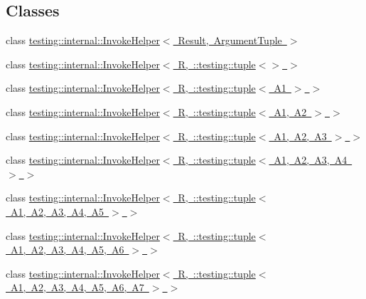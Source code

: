 \subsection*{Classes}
\begin{DoxyCompactItemize}
\item 
class \mbox{\hyperlink{classtesting_1_1internal_1_1_invoke_helper}{testing\+::internal\+::\+Invoke\+Helper$<$ Result, Argument\+Tuple $>$}}
\item 
class \mbox{\hyperlink{classtesting_1_1internal_1_1_invoke_helper_3_01_r_00_01_1_1testing_1_1tuple_3_4_01_4}{testing\+::internal\+::\+Invoke\+Helper$<$ R, \+::testing\+::tuple$<$$>$ $>$}}
\item 
class \mbox{\hyperlink{classtesting_1_1internal_1_1_invoke_helper_3_01_r_00_01_1_1testing_1_1tuple_3_01_a1_01_4_01_4}{testing\+::internal\+::\+Invoke\+Helper$<$ R, \+::testing\+::tuple$<$ A1 $>$ $>$}}
\item 
class \mbox{\hyperlink{classtesting_1_1internal_1_1_invoke_helper_3_01_r_00_01_1_1testing_1_1tuple_3_01_a1_00_01_a2_01_4_01_4}{testing\+::internal\+::\+Invoke\+Helper$<$ R, \+::testing\+::tuple$<$ A1, A2 $>$ $>$}}
\item 
class \mbox{\hyperlink{classtesting_1_1internal_1_1_invoke_helper_3_01_r_00_01_1_1testing_1_1tuple_3_01_a1_00_01_a2_00_01_a3_01_4_01_4}{testing\+::internal\+::\+Invoke\+Helper$<$ R, \+::testing\+::tuple$<$ A1, A2, A3 $>$ $>$}}
\item 
class \mbox{\hyperlink{classtesting_1_1internal_1_1_invoke_helper_3_01_r_00_01_1_1testing_1_1tuple_3_01_a1_00_01_a2_00_01_a3_00_01_a4_01_4_01_4}{testing\+::internal\+::\+Invoke\+Helper$<$ R, \+::testing\+::tuple$<$ A1, A2, A3, A4 $>$ $>$}}
\item 
class \mbox{\hyperlink{classtesting_1_1internal_1_1_invoke_helper_3_01_r_00_01_1_1testing_1_1tuple_3_01_a1_00_01_a2_00_5dd6c0827e45a39a81d93a14211e2a19}{testing\+::internal\+::\+Invoke\+Helper$<$ R, \+::testing\+::tuple$<$ A1, A2, A3, A4, A5 $>$ $>$}}
\item 
class \mbox{\hyperlink{classtesting_1_1internal_1_1_invoke_helper_3_01_r_00_01_1_1testing_1_1tuple_3_01_a1_00_01_a2_00_5653fefa261cff106ebaaf9c78f6ee42}{testing\+::internal\+::\+Invoke\+Helper$<$ R, \+::testing\+::tuple$<$ A1, A2, A3, A4, A5, A6 $>$ $>$}}
\item 
class \mbox{\hyperlink{classtesting_1_1internal_1_1_invoke_helper_3_01_r_00_01_1_1testing_1_1tuple_3_01_a1_00_01_a2_00_9169216bddd5005837acd145af38ec6f}{testing\+::internal\+::\+Invoke\+Helper$<$ R, \+::testing\+::tuple$<$ A1, A2, A3, A4, A5, A6, A7 $>$ $>$}}

\end{DoxyCompactItemize}
